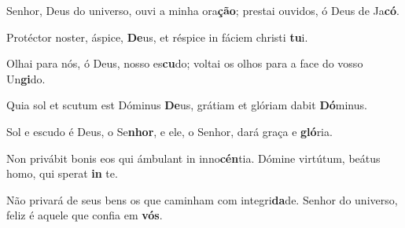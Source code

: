 \begin{greenumerate}
  \item Senhor, Deus do universo, ouvi a minha ora\textbf{ção}; {\GreStar} prestai ouvidos, ó Deus de Ja\textbf{có}. 

  \switchcolumn*


  \item Protéctor noster, áspice, \textbf{De}us, {\GreStar} et réspice in fáciem christi \textbf{tu}i. 

  \switchcolumn%

  \item Olhai para nós, ó Deus, nosso es\textbf{cu}do; {\GreStar} voltai os olhos para a face do vosso Un\textbf{gi}do. 

  \switchcolumn*


  \item Quia sol et scutum est Dóminus \textbf{De}us, {\GreStar} grátiam et glóriam dabit \textbf{Dó}minus. 

  \switchcolumn%

  \item Sol e escudo é Deus, o Se\textbf{nhor}, {\GreStar} e ele, o Senhor, dará graça e \textbf{gló}ria. 

  \switchcolumn*


  \item Non privábit bonis eos qui ámbulant in inno\textbf{cén}tia. {\GreStar} Dómine virtútum, beátus homo, qui sperat \textbf{in} te. 

  \switchcolumn%

  \item Não privará de seus bens os que caminham com integri\textbf{da}de. {\GreStar} Senhor do universo, feliz é aquele que confia em \textbf{vós}. 
\end{greenumerate}

\switchcolumn*